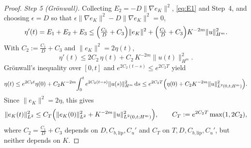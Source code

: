\documentclass[a4paper,fleqn]{cas-sc}
\theoremstyle{definition}
\theoremstyle{remark}
\begin{document}
\begin{proof}
\emph{Step 5 (Gr\"onwall).} Collecting $E_2=-D\|\nabla e_K\|^2$, \eqref{eq:E1} and
Step~4, and choosing $\epsilon=D$ so that $\epsilon\|\nabla e_K\|^2-D\|\nabla e_K\|^2=0$,
\[
\eta'(t)=E_1+E_2+E_3
\le\Bigl(\tfrac{C_1}{D}+C_3\Bigr)\|e_K\|^2+\Bigl(\tfrac{C_1}{D}+C_3\Bigr)K^{-2m}\|u\|_{H^m}^2.
\]
With $C_2:=\tfrac{C_1}{D}+C_3$ and $\|e_K\|^2=2\eta(t)$,
\[
\eta'(t)\le 2C_2\,\eta(t)+C_2\,K^{-2m}\|u(t)\|_{H^m}^2.
\]
Gr\"onwall's inequality over $[0,t]$ and $e^{2C_2(t-s)}\le e^{2C_2T}$ yield
\[
\eta(t)\le e^{2C_2t}\eta(0)+C_2K^{-2m}\!\int_0^t e^{2C_2(t-s)}\|u(s)\|_{H^m}^2\,\mathrm{d} s
\le e^{2C_2T}\Bigl(\eta(0)+C_2K^{-2m}\|u\|_{L^2(0,t;H^m)}^2\Bigr).
\]
Since $\|e_K\|^2=2\eta$, this gives
\[
\|e_K(t)\|_{L^2}^2\le C_T\Bigl(\|e_K(0)\|_{L^2}^2+K^{-2m}\|u\|_{L^2(0,t;H^m)}^2\Bigr),
\qquad C_T:=e^{2C_2T}\max(1,2C_2),
\]
where $C_2=\tfrac{C_1}{D}+C_3$ depends on $D,C_{b,\mathrm{lip}},C_u'$ and $C_T$ on
$T,D,C_{b,\mathrm{lip}},C_u'$, but neither depends on $K$.
\end{proof}
\end{document}

